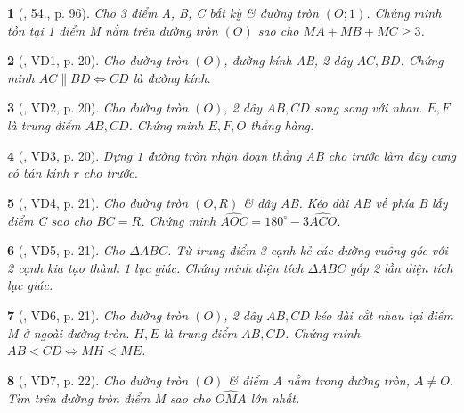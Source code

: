 \documentclass{article}
\newtheorem{baitoan}{}
\begin{document}
\begin{baitoan}[\cite{Binh_Toan_9_tap_1}, 54., p. 96]
	Cho 3 điểm A, B, C bất kỳ \& đường tròn $(O;1)$. Chứng minh tồn tại 1 điểm M nằm trên đường tròn $(O)$ sao cho $MA + MB + MC\ge3$.
\end{baitoan}

\begin{baitoan}[\cite{TLCT_THCS_Toan_9_hinh_hoc}, VD1, p. 20]
	Cho đường tròn $(O)$, đường kính AB, 2 dây $AC,BD$. Chứng minh $AC\parallel BD\Leftrightarrow CD$ là đường kính.
\end{baitoan}

\begin{baitoan}[\cite{TLCT_THCS_Toan_9_hinh_hoc}, VD2, p. 20]
	Cho đường tròn $(O)$, 2 dây $AB,CD$ song song với nhau. $E,F$ là trung điểm $AB,CD$. Chứng minh $E,F,O$ thẳng hàng.
\end{baitoan}

\begin{baitoan}[\cite{TLCT_THCS_Toan_9_hinh_hoc}, VD3, p. 20]
	Dựng 1 đường tròn nhận đoạn thẳng AB cho trước làm dây cung có bán kính $r$ cho trước.
\end{baitoan}

\begin{baitoan}[\cite{TLCT_THCS_Toan_9_hinh_hoc}, VD4, p. 21]
	Cho đường tròn $(O,R)$ \& dây AB. Kéo dài AB về phía B lấy điểm C sao cho $BC = R$. Chứng minh $\widehat{AOC} = 180^\circ - 3\widehat{ACO}$.
\end{baitoan}

\begin{baitoan}[\cite{TLCT_THCS_Toan_9_hinh_hoc}, VD5, p. 21]
	Cho $\Delta ABC$. Từ trung điểm 3 cạnh kẻ các đường vuông góc với 2 cạnh kia tạo thành 1 lục giác. Chứng minh diện tích $\Delta ABC$ gấp 2 lần diện tích lục giác.
\end{baitoan}

\begin{baitoan}[\cite{TLCT_THCS_Toan_9_hinh_hoc}, VD6, p. 21]
	Cho đường tròn $(O)$, 2 dây $AB,CD$ kéo dài cắt nhau tại điểm M ở ngoài đường tròn. $H,E$ là trung điểm $AB,CD$. Chứng minh $AB < CD\Leftrightarrow MH < ME$.
\end{baitoan}

\begin{baitoan}[\cite{TLCT_THCS_Toan_9_hinh_hoc}, VD7, p. 22]
	Cho đường tròn $(O)$ \& điểm A nằm trong đường tròn, $A\ne O$. Tìm trên đường tròn điểm M sao cho $\widehat{OMA}$ lớn nhất.
\end{baitoan}
\end{document}
